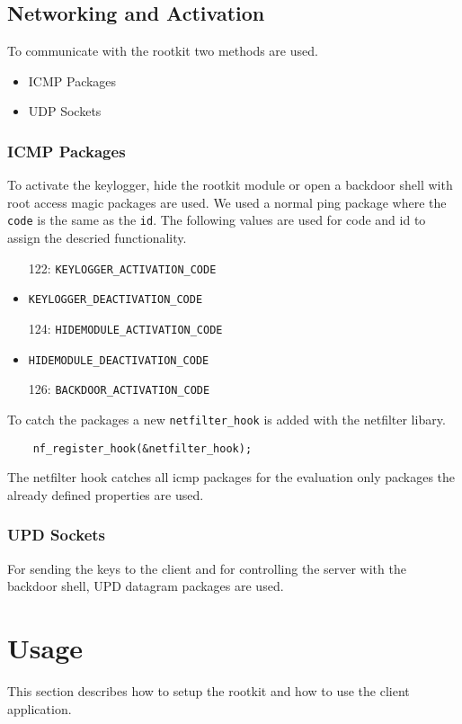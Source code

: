 \documentclass[12pt]{article}
\begin{document}
\subsection{Networking and Activation}
\label{sec:magicpackage}
To communicate with the rootkit two methods are used.
\begin{itemize}
	\item ICMP Packages
	\item UDP Sockets
\end{itemize}
\subsubsection{ICMP Packages}
To activate the keylogger, hide the rootkit module or open a backdoor shell with root access magic packages are used. We used a normal ping package where the \lstinline{code} is the same as the \lstinline{id}. The following values are used for code and id to assign the descried functionality.
\begin{itemize}
	\item[122:] \lstinline{KEYLOGGER_ACTIVATION_CODE}
	\item[123:] \lstinline{KEYLOGGER_DEACTIVATION_CODE}
	\item[124:] \lstinline{HIDEMODULE_ACTIVATION_CODE}
	\item[125:] \lstinline{HIDEMODULE_DEACTIVATION_CODE}
	\item[126:] \lstinline{BACKDOOR_ACTIVATION_CODE}
\end{itemize}

To catch the packages a new \lstinline{netfilter_hook} is added with the netfilter libary. 
\begin{lstlisting}
	nf_register_hook(&netfilter_hook);
\end{lstlisting}

The netfilter hook catches all icmp packages for the evaluation only packages the already defined properties are used. 

\subsubsection{UPD Sockets}
For sending the keys to the client and for controlling the server with the backdoor shell, UPD datagram packages are used.

\section{Usage}
\label{sec:usage}
This section describes how to setup the rootkit and how to use the client application.
\end{document}
